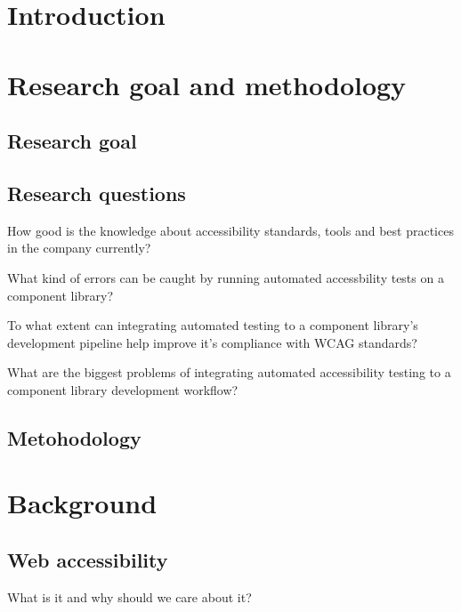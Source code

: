 \documentclass{master_thesis}
\begin{document}
\tableofcontents

\section*{Introduction}

\section{Research goal and methodology}
	\subsection{Research goal}
	\subsection{Research questions}

	\begin{RQlist}
		\item How good is the knowledge about accessibility standards, tools and best practices in the company currently?
		\item What kind of errors can be caught by running automated accessbility tests on a component library?
		\item To what extent can integrating automated testing to a component library's development pipeline help improve it's compliance with WCAG standards?
		\item What are the biggest problems of integrating automated accessibility testing to a component library development workflow?
	\end{RQlist}
	\subsection{Metohodology}

\section{Background}
	\subsection{Web accessibility}
	What is it and why should we care about it?
\end{document}
